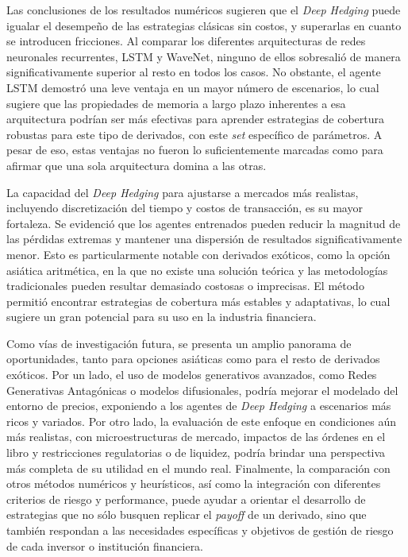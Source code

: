 \documentclass[11pt,a4paper,spanish]{article}
\numberwithin{equation}{section} %
\begin{document}
Las conclusiones de los resultados numéricos sugieren que el \textit{Deep Hedging} puede igualar el desempeño de las estrategias clásicas sin costos, y superarlas en cuanto se introducen fricciones. Al comparar los diferentes arquitecturas de redes neuronales recurrentes, LSTM y WaveNet, ninguno de ellos sobresalió de manera significativamente superior al resto en todos los casos. No obstante, el agente LSTM demostró una leve ventaja en un mayor número de escenarios, lo cual sugiere que las propiedades de memoria a largo plazo inherentes a esa arquitectura podrían ser más efectivas para aprender estrategias de cobertura robustas para este tipo de derivados, con este \textit{set} específico de parámetros. A pesar de eso, estas ventajas no fueron lo suficientemente marcadas como para afirmar que una sola arquitectura domina a las otras.

La capacidad del \textit{Deep Hedging} para ajustarse a mercados más realistas, incluyendo discretización del tiempo y costos de transacción, es su mayor fortaleza. Se evidenció que los agentes entrenados pueden reducir la magnitud de las pérdidas extremas y mantener una dispersión de resultados significativamente menor. Esto es particularmente notable con derivados exóticos, como la opción asiática aritmética, en la que no existe una solución teórica y las metodologías tradicionales pueden resultar demasiado costosas o imprecisas. El método permitió encontrar estrategias de cobertura más estables y adaptativas, lo cual sugiere un gran potencial para su uso en la industria financiera.

Como vías de investigación futura, se presenta un amplio panorama de oportunidades, tanto para opciones asiáticas como para el resto de derivados exóticos. Por un lado, el uso de modelos generativos avanzados, como Redes Generativas Antagónicas o modelos difusionales, podría mejorar el modelado del entorno de precios, exponiendo a los agentes de \textit{Deep Hedging} a escenarios más ricos y variados. Por otro lado, la evaluación de este enfoque en condiciones aún más realistas, con microestructuras de mercado, impactos de las órdenes en el libro y restricciones regulatorias o de liquidez, podría brindar una perspectiva más completa de su utilidad en el mundo real. Finalmente, la comparación con otros métodos numéricos y heurísticos, así como la integración con diferentes criterios de riesgo y performance, puede ayudar a orientar el desarrollo de estrategias que no sólo busquen replicar el \textit{payoff} de un derivado, sino que también respondan a las necesidades específicas y objetivos de gestión de riesgo de cada inversor o institución financiera.
\end{document}
